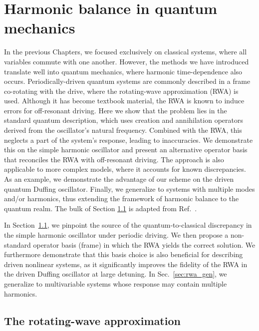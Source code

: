 
\chapter{Harmonic balance in quantum mechanics} \label{ch:rwa}

\begin{chapterabstract}
	In the previous Chapters, we focused exclusively on classical systems, where all variables commute with one another. However, the methods we have introduced translate well into quantum mechanics, where harmonic time-dependence also occurs. Periodically-driven quantum systems are commonly described in a frame co-rotating with the drive, where the rotating-wave approximation (RWA) is used. Although it has become textbook material, the RWA is known to induce errors for off-resonant driving. Here we show that the problem lies in the standard quantum description, which uses creation and annihilation operators derived from the oscillator’s natural frequency. Combined with the RWA, this neglects a part of the system's response, leading to inaccuracies. We demonstrate this on the simple harmonic oscillator and present an alternative operator basis that reconciles the RWA with off-resonant driving. The approach is also applicable to more complex models, where it accounts for known discrepancies. As an example, we demonstrate the advantage of our scheme on the driven quantum Duffing oscillator. Finally, we generalize to systems with multiple modes and/or harmonics, thus extending the framework of harmonic balance to the quantum realm.
	\tcblower
	The bulk of Section \ref{sec:rwa_rwa} is adapted from Ref.~\cite{Kosata_2022b}.
\end{chapterabstract}

In Section~\ref{sec:rwa_rwa}, we pinpoint the source of the quantum-to-classical discrepancy in the simple harmonic oscillator under periodic driving. We then propose a non-standard operator basis (frame) in which the RWA yields the correct solution. We furthermore demonstrate that this basis choice is also beneficial for describing driven nonlinear systems, as it significantly improves the fidelity of the RWA in the driven Duffing oscillator at large detuning. In Sec.~\ref{sec:rwa_gen}, we generalize to multivariable systems whose response may contain multiple harmonics.

\section{The rotating-wave approximation} \label{sec:rwa_rwa}

